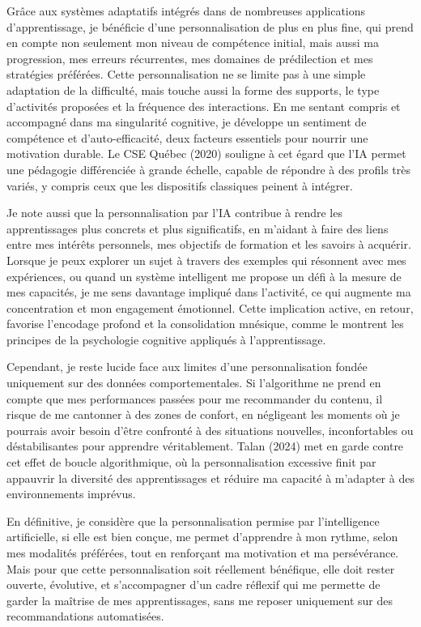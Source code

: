\documentclass[11pt,a4paper]{report}
\begin{document}
Grâce aux systèmes adaptatifs intégrés dans de nombreuses applications d’apprentissage, je bénéficie d’une personnalisation de plus en plus fine, qui prend en compte non seulement mon niveau de compétence initial, mais aussi ma progression, mes erreurs récurrentes, mes domaines de prédilection et mes stratégies préférées. Cette personnalisation ne se limite pas à une simple adaptation de la difficulté, mais touche aussi la forme des supports, le type d’activités proposées et la fréquence des interactions. En me sentant compris et accompagné dans ma singularité cognitive, je développe un sentiment de compétence et d’auto-efficacité, deux facteurs essentiels pour nourrir une motivation durable. Le CSE Québec (2020) souligne à cet égard que l’IA permet une pédagogie différenciée à grande échelle, capable de répondre à des profils très variés, y compris ceux que les dispositifs classiques peinent à intégrer.

Je note aussi que la personnalisation par l’IA contribue à rendre les apprentissages plus concrets et plus significatifs, en m’aidant à faire des liens entre mes intérêts personnels, mes objectifs de formation et les savoirs à acquérir. Lorsque je peux explorer un sujet à travers des exemples qui résonnent avec mes expériences, ou quand un système intelligent me propose un défi à la mesure de mes capacités, je me sens davantage impliqué dans l’activité, ce qui augmente ma concentration et mon engagement émotionnel. Cette implication active, en retour, favorise l’encodage profond et la consolidation mnésique, comme le montrent les principes de la psychologie cognitive appliqués à l’apprentissage.

Cependant, je reste lucide face aux limites d’une personnalisation fondée uniquement sur des données comportementales. Si l’algorithme ne prend en compte que mes performances passées pour me recommander du contenu, il risque de me cantonner à des zones de confort, en négligeant les moments où je pourrais avoir besoin d’être confronté à des situations nouvelles, inconfortables ou déstabilisantes pour apprendre véritablement. Talan (2024) met en garde contre cet effet de boucle algorithmique, où la personnalisation excessive finit par appauvrir la diversité des apprentissages et réduire ma capacité à m’adapter à des environnements imprévus.

En définitive, je considère que la personnalisation permise par l’intelligence artificielle, si elle est bien conçue, me permet d’apprendre à mon rythme, selon mes modalités préférées, tout en renforçant ma motivation et ma persévérance. Mais pour que cette personnalisation soit réellement bénéfique, elle doit rester ouverte, évolutive, et s’accompagner d’un cadre réflexif qui me permette de garder la maîtrise de mes apprentissages, sans me reposer uniquement sur des recommandations automatisées.
\end{document}
